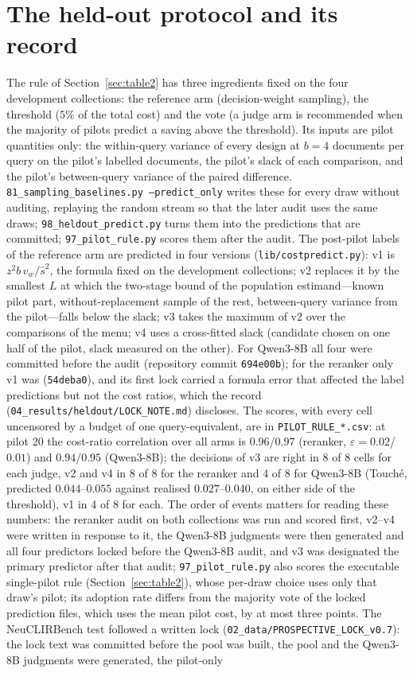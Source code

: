 \documentclass{article}
\newcommand{\eps}{\varepsilon}
\begin{document}
\section{The held-out protocol and its record}\label{app:heldout}
The rule of Section~\ref{sec:table2} has three ingredients fixed on the four development collections: the reference arm (decision-weight sampling), the threshold ($5\%$ of the total cost) and the vote (a judge arm is recommended when the majority of pilots predict a saving above the threshold). Its inputs are pilot quantities only: the within-query variance of every design at $b=4$ documents per query on the pilot's labelled documents, the pilot's slack of each comparison, and the pilot's between-query variance of the paired difference. \texttt{81\_sampling\_baselines.py --predict\_only} writes these for every draw without auditing, replaying the random stream so that the later audit uses the same draws; \texttt{98\_heldout\_predict.py} turns them into the predictions that are committed; \texttt{97\_pilot\_rule.py} scores them after the audit. The post-pilot labels of the reference arm are predicted in four versions (\texttt{lib/costpredict.py}): v1 is $z^2 b\,v_w/\hat s^2$, the formula fixed on the development collections; v2 replaces it by the smallest $L$ at which the two-stage bound of the population estimand---known pilot part, without-replacement sample of the rest, between-query variance from the pilot---falls below the slack; v3 takes the maximum of v2 over the comparisons of the menu; v4 uses a cross-fitted slack (candidate chosen on one half of the pilot, slack measured on the other). For Qwen3-8B all four were committed before the audit (repository commit \texttt{694e00b}); for the reranker only v1 was (\texttt{54deba0}), and its first lock carried a formula error that affected the label predictions but not the cost ratios, which the record (\texttt{04\_results/heldout/LOCK\_NOTE.md}) discloses. The scores, with every cell uncensored by a budget of one query-equivalent, are in \texttt{PILOT\_RULE\_*.csv}: at pilot 20 the cost-ratio correlation over all arms is $0.96$/$0.97$ (reranker, $\eps=0.02$/$0.01$) and $0.94$/$0.95$ (Qwen3-8B); the decisions of v3 are right in 8 of 8 cells for each judge, v2 and v4 in 8 of 8 for the reranker and 4 of 8 for Qwen3-8B (Touch\'e, predicted $0.044$--$0.055$ against realised $0.027$--$0.040$, on either side of the threshold), v1 in 4 of 8 for each. The order of events matters for reading these numbers: the reranker audit on both collections was run and scored first, v2--v4 were written in response to it, the Qwen3-8B judgments were then generated and all four predictors locked before the Qwen3-8B audit, and v3 was designated the primary predictor after that audit; \texttt{97\_pilot\_rule.py} also scores the executable single-pilot rule (Section~\ref{sec:table2}), whose per-draw choice uses only that draw's pilot; its adoption rate differs from the majority vote of the locked prediction files, which uses the mean pilot cost, by at most three points. The NeuCLIRBench test followed a written lock (\texttt{02\_data/PROSPECTIVE\_LOCK\_v0.7}): the lock text was committed before the pool was built, the pool and the Qwen3-8B judgments were generated, the pilot-only 
\end{document}
